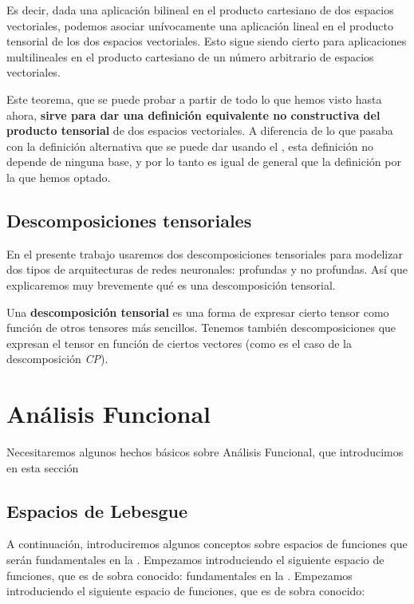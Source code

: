 Es decir, dada una aplicación bilineal en el producto cartesiano de dos espacios vectoriales, podemos asociar unívocamente una aplicación lineal en el producto tensorial de los dos espacios vectoriales. Esto sigue siendo cierto para aplicaciones multilineales en el producto cartesiano de un número arbitrario de espacios vectoriales.

Este teorema, que se puede probar a partir de todo lo que hemos visto hasta ahora, \textbf{sirve para dar una definición equivalente no constructiva del producto tensorial} de dos espacios vectoriales. A diferencia de lo que pasaba con la definición alternativa que se puede dar usando el , esta definición no depende de ninguna base, y por lo tanto es igual de general que la definición por la que hemos optado.

\subsection{Descomposiciones tensoriales}

En el presente trabajo usaremos dos descomposiciones tensoriales para modelizar dos tipos de arquitecturas de redes neuronales: profundas y no profundas. Así que explicaremos muy brevemente qué es una descomposición tensorial.

Una \textbf{descomposición tensorial} es una forma de expresar cierto tensor como función de otros tensores más sencillos. Tenemos también descomposiciones que expresan el tensor en función de ciertos vectores (como es el caso de la descomposición \textit{CP}).

\section{Análisis Funcional} \label{sec:preliminares_funcional}

Necesitaremos algunos hechos básicos sobre Análisis Funcional, que introducimos en esta sección

\subsection{Espacios de Lebesgue}

A continuación, introduciremos algunos conceptos sobre espacios de funciones que serán fundamentales en la . Empezamos introduciendo el siguiente espacio de funciones, que es de sobra conocido:
fundamentales en la . Empezamos introduciendo el siguiente espacio de funciones, que es de sobra conocido:

